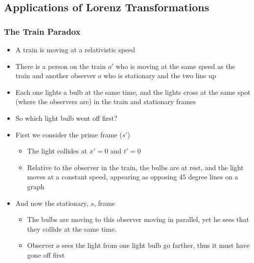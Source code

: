 \documentclass[12pt,letterpaper, twocolumn]{article}
\begin{document}
\subsection{Applications of Lorenz Transformations}
\subsubsection*{The Train Paradox}
\begin{itemize}
    \item A train is moving at a relativistic speed
    \item There is a person on the train $o'$ who is moving at the same speed as the train and another observer $o$ who is stationary and the two line up
    \item Each one lights a bulb at the same time, and the lights cross at the same spot (where the observers are) in the train and stationary frames
    \item So which light bulb went off first? 
    \item First we consider the prime frame ($s'$)
    \begin{itemize}
        \item The light collides at $x'=0$ and $t'=0$
        \item Relative to the observer in the train, the bulbs are at rest, and the light moves at a constant speed, appearing as opposing 45 degree lines on a graph
    \end{itemize}
    \item And now the stationary, $s$, frame
    \begin{itemize}
        \item The bulbs are moving to this observer moving in parallel, yet he sees that they collide at the same time. 
        \item Observer $o$ sees the light from one light bulb go farther, thus it must have gone off first  
    \end{itemize}
\end{itemize}
\end{document}
